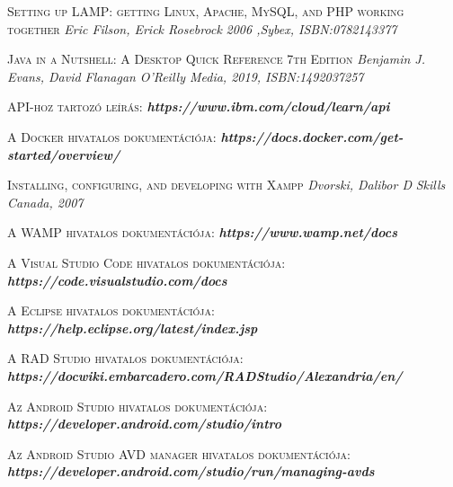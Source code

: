\documentclass[
]{thesis-ekf}
\theoremstyle{definition}
\theoremstyle{remark}
\begin{document}
	
	\begin{thebibliography}{2}
		
		\textsc{Setting up LAMP: getting Linux, Apache, MySQL, and PHP working together}
		\newline
		\emph{Eric Filson, Erick Rosebrock}
		\emph{2006 ,Sybex, ISBN:0782143377}
		
		\textsc{Java in a Nutshell: A Desktop Quick Reference 7th Edition}
		\newline
		\emph{Benjamin J. Evans, David Flanagan}
		\emph{O'Reilly Media, 2019, ISBN:1492037257}
		
		\textsc{API-hoz tartozó leírás:}
		\newline
		\emph{\bf{https://www.ibm.com/cloud/learn/api}}
		
		\textsc{A Docker hivatalos dokumentációja:}
		\newline
		\emph{\bf{https://docs.docker.com/get-started/overview/}}
		
		\textsc{Installing, configuring, and developing with Xampp}
		\newline
		\emph{Dvorski, Dalibor D}
		\emph{Skills Canada, 2007}
		
		\textsc{A WAMP hivatalos dokumentációja:}
		\newline
		\emph{\bf{https://www.wamp.net/docs}}
		
		\textsc{A Visual Studio Code hivatalos dokumentációja:}
		\newline
		\emph{\bf{https://code.visualstudio.com/docs}}
		
		\textsc{A Eclipse hivatalos dokumentációja:}
		\newline
		\emph{\bf{https://help.eclipse.org/latest/index.jsp}}
		
		\textsc{A RAD Studio hivatalos dokumentációja:}
		\newline
		\emph{\bf{https://docwiki.embarcadero.com/RADStudio/Alexandria/en/}}
		
		\textsc{Az Android Studio hivatalos dokumentációja:}
		\newline
		\emph{\bf{https://developer.android.com/studio/intro}}
		
		\textsc{Az Android Studio AVD manager hivatalos dokumentációja:}
		\newline
		\emph{\bf{https://developer.android.com/studio/run/managing-avds}}
		

\end{thebibliography}
\end{document}
